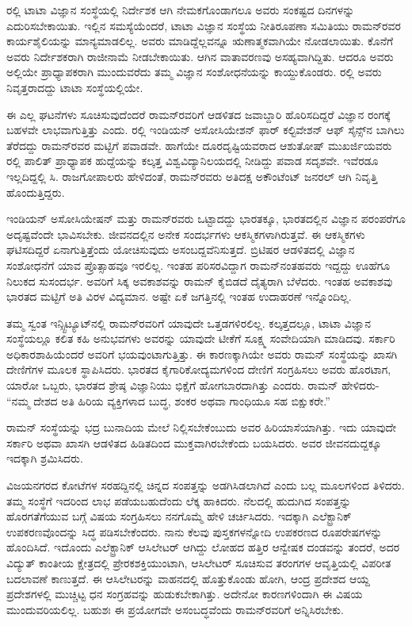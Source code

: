 ರಲ್ಲಿ ಟಾಟಾ ವಿಜ್ಞಾನ ಸಂಸ್ಥೆಯಲ್ಲಿ ನಿರ್ದೇಶಕ ಆಗಿ ನೇಮಕಗೊಂಡಾಗಲೂ ಅವರು ಸಂಕಷ್ಟದ ದಿನಗಳನ್ನು ಎದುರಿಸಬೇಕಾಯಿತು. ಇಲ್ಲಿನ ಸಮಸ್ಯೆಯೆಂದರೆ, ಟಾಟಾ ವಿಜ್ಞಾನ ಸಂಸ್ಥೆಯ ನೀತಿರೂಪಣಾ ಸಮಿತಿಯು ರಾಮನ್‍ರವರ ಕಾರ್ಯಶೈಲಿಯನ್ನು ಮಾನ್ಯಮಾಡಲಿಲ್ಲ. ಅವರು ಮಾಡಿದ್ದೆಲ್ಲವನ್ನೂ ಋಣಾತ್ಮಕವಾಗಿಯೇ ನೋಡಲಾಯಿತು. ಕೊನೆಗೆ ಅವರು ನಿರ್ದೇಶಕರಾಗಿ ರಾಜೀನಾಮೆ ನೀಡಬೇಕಾಯಿತು. ಆಗಿನ ವಾತಾವರಣವು ಅಸಹ್ಯವಾಗಿದ್ದಿತು. ಆದರೂ ಅವರು ಅಲ್ಲಿಯೇ ಪ್ರಾಧ್ಯಾಪಕರಾಗಿ ಮುಂದುವರೆದು ತಮ್ಮ ವಿಜ್ಞಾನ ಸಂಶೋಧನೆಯನ್ನು ಕಾಯ್ದುಕೊಂಡರು. ರಲ್ಲಿ ಅವರು ನಿವೃತ್ತರಾದದ್ದು ಟಾಟಾ ಸಂಸ್ಥೆಯಲ್ಲಿಯೇ.

ಈ ಎಲ್ಲ ಘಟನೆಗಳು ಸೂಚಿಸುವುದೆಂದರೆ ರಾಮನ್‍ರವರಿಗೆ ಆಡಳಿತದ ಜವಾಬ್ದಾರಿ ಹೊರಿಸದಿದ್ದರೆ ವಿಜ್ಞಾನ ರಂಗಕ್ಕೆ ಬಹಳವೇ ಲಾಭವಾಗುತ್ತಿತ್ತು ಎಂದು. ರಲ್ಲಿ ಇಂಡಿಯನ್ ಅಸೋಸಿಯೇಶನ್ ಫಾರ್ ಕಲ್ಟಿವೇಶನ್ ಆಫ್ ಸೈನ್ಸ್‌ನ ಬಾಗಿಲು ತೆರೆದದ್ದು ರಾಮನ್‍ರವರ ಮಟ್ಟಿಗೆ ಪವಾಡವೇ. ಹಾಗೆಯೇ ದೂರದೃಷ್ಟಿಯವರಾದ ಆಶುತೋಷ್ ಮುಖರ್ಜಿಯವರು ರಲ್ಲಿ ಪಾಲಿತ್ ಪ್ರಾಧ್ಯಾಪಕ ಹುದ್ದೆಯನ್ನು ಕಲ್ಕತ್ತ ವಿಶ್ವವಿದ್ಯಾನಿಲಯದಲ್ಲಿ ನೀಡಿದ್ದು ಪವಾಡ ಸದೃಶವೇ. ಇವೆರಡೂ ಇಲ್ಲದಿದ್ದಲ್ಲಿ ಸಿ. ರಾಜಗೋಪಾಲರು ಹೇಳಿದಂತೆ, ರಾಮನ್‍ರವರು ಅತಿದಕ್ಷ ಅಕೌಂಟೆಂಟ್ ಜನರಲ್ ಆಗಿ ನಿವೃತ್ತಿ ಹೊಂದುತ್ತಿದ್ದರು.

ಇಂಡಿಯನ್ ಅಸೋಸಿಯೇಷನ್ ಮತ್ತು ರಾಮನ್‍ರವರು ಒಟ್ಟಾದದ್ದು ಭಾರತಕ್ಕೂ, ಭಾರತದಲ್ಲಿನ ವಿಜ್ಞಾನ ಪರಂಪರೆಗೂ ಅದೃಷ್ಟವೆಂದೇ ಭಾವಿಸಬೇಕು. ಜೀವನದಲ್ಲಿನ ಅನೇಕ ಸಂದರ್ಭಗಳು ಆಕಸ್ಮಿಕಗಳಾಗಿರುತ್ತವೆ. ಈ ಆಕಸ್ಮಿಕಗಳು ಘಟಿಸದಿದ್ದರೆ ಏನಾಗುತ್ತಿತ್ತೆಂದು ಯೋಚಿಸುವುದು ಅಸಂಬದ್ದವೆನಿಸುತ್ತದೆ. ಬ್ರಿಟಿಷರ ಆಡಳಿತದಲ್ಲಿ ವಿಜ್ಞಾನ ಸಂಶೋಧನೆಗೆ ಯಾವ ಪ್ರೊತ್ಸಾಹವೂ ಇರಲಿಲ್ಲ. ಇಂತಹ ಪರಿಸರವಿದ್ದಾಗ ರಾಮನ್‌ನಂತಹವರು ಇದ್ದದ್ದು ಊಹೆಗೂ ನಿಲುಕದ ಸುಸಂದರ್ಭ. ಅವರಿಗೆ ಸಿಕ್ಕ ಅವಕಾಶವನ್ನು ರಾಮನ್ ಕೈಬಿಡದೆ ದೈತ್ಯರಾಗಿ ಬೆಳೆದರು. ಇಂತಹ ಅವಕಾಶವು ಭಾರತದ ಮಟ್ಟಿಗೆ ಅತಿ ವಿರಳ ವಿದ್ಯಮಾನ. ಅಷ್ಟೇ ಏಕೆ ಜಗತ್ತಿನಲ್ಲಿ ಇಂತಹ ಉದಾಹರಣೆ ಇನ್ನೊಂದಿಲ್ಲ.

ತಮ್ಮ ಸ್ವಂತ ಇನ್ಸ್ಟಿಟ್ಯೂಟ್‍ನಲ್ಲಿ ರಾಮನ್‍ರವರಿಗೆ ಯಾವುದೇ ಒತ್ತಡಗಳಿರಲಿಲ್ಲ. ಕಲ್ಕತ್ತದಲ್ಲೂ, ಟಾಟಾ ವಿಜ್ಞಾನ ಸಂಸ್ಥೆಯಲ್ಲೂ ಕಲಿತ ಕಹಿ ಅನುಭವಗಳು ಅವರನ್ನು ಯಾವುದೇ ಟೀಕೆಗೆ ಸೂಕ್ಷ್ಮ ಸಂವೇದಿಯಾಗಿ ಮಾಡಿದವು. ಸರ್ಕಾರಿ ಅಧಿಕಾರಶಾಹಿಯೆಂದರೆ ಅವರಿಗೆ ಭಯವುಂಟಾಗುತ್ತಿತ್ತು. ಈ ಕಾರಣಕ್ಕಾಗಿಯೇ ಅವರು ರಾಮನ್ ಸಂಸ್ಥೆಯನ್ನು ಖಾಸಗಿ ದೇಣಿಗೆಗಳ ಮೂಲಕ ಸ್ಥಾಪಿಸಿದರು. ಭಾರತದ ಕೈಗಾರಿಕೋದ್ಯಮಗಳಿಂದ ದೇಣಿಗೆ ಸಂಗ್ರಹಿಸಲು ಅವರು ಹೊರಟಾಗ, ಯಾರೋ ಒಬ್ಬರು, ಭಾರತದ ಶ್ರೇಷ್ಠ ವಿಜ್ಞಾನಿಯು ಭಿಕ್ಷೆಗೆ ಹೋಗಬಾರದಾಗಿತ್ತು ಎಂದರು. ರಾಮನ್ ಹೇಳಿದರು- “ನಮ್ಮ ದೇಶದ ಅತಿ ಹಿರಿಯ ವ್ಯಕ್ತಿಗಳಾದ ಬುದ್ಧ, ಶಂಕರ ಅಥವಾ ಗಾಂಧಿಯೂ ಸಹ ಬಿಕ್ಷುಕರೇ.”

ರಾಮನ್ ಸಂಸ್ಥೆಯನ್ನು ಭದ್ರ ಬುನಾದಿಯ ಮೇಲೆ ನಿಲ್ಲಿಸಬೇಕೆಂಬುದು ಅವರ ಹಿರಿಯಾಸೆಯಾಗಿತ್ತು. ಇದು ಯಾವುದೇ ಸರ್ಕಾರಿ ಅಥವಾ ಖಾಸಗಿ ಆಡಳಿತದ ಹಿಡಿತದಿಂದ ಮುಕ್ತವಾಗಿರಬೇಕೆಂದು ಬಯಸಿದರು. ಅವರ ಜೀವನದುದ್ದಕ್ಕೂ ಇದಕ್ಕಾಗಿ ಶ್ರಮಿಸಿದರು.

ವಿಜಯನಗರದ ಕೋಟೆಗಳ ಸರಹದ್ದಿನಲ್ಲಿ ಚಿನ್ನದ ಸಂಪತ್ತನ್ನು ಅಡಗಿಸಿಡಲಾಗಿದೆ ಎಂದು ಬಲ್ಲ ಮೂಲಗಳಿಂದ ತಿಳಿದರು. ತಮ್ಮ ಸಂಸ್ಥೆಗೆ ಇದರಿಂದ ಲಾಭ ಪಡೆಯಬಹುದೆಂದು ಲೆಕ್ಕ ಹಾಕಿದರು. ನೆಲದಲ್ಲಿ ಹುದುಗಿದ ಸಂಪತ್ತನ್ನು ಹೊರಗತೆಗೆಯುವ ಬಗ್ಗೆ ವಿಷಯ ಸಂಗ್ರಹಿಸಲು ನನಗೊಮ್ಮೆ ಹೇಳಿ ಚರ್ಚಿಸಿದರು. ಇದಕ್ಕಾಗಿ ಎಲೆಕ್ಟ್ರಾನಿಕ್ ಉಪಕರಣವೊಂದನ್ನು ಸಿದ್ಧ ಪಡಿಸಬೇಕೆಂದರು. ನಾನು ಕೆಲವು ಪುಸ್ತಕಗಳನ್ನೋದಿ ಉಪಕರಣದ ರೂಪರೇಷಗಳನ್ನು ಹೊಂದಿಸಿದೆ. ಇದೊಂದು ಎಲೆಕ್ಟ್ರಾನಿಕ್ ಆಸಿಲೇಟರ್ ಆಗಿದ್ದು ಲೋಹದ ಹತ್ತಿರ ಆನ್ವೇಷಕ ದಂಡವನ್ನು ತಂದರೆ, ಅದರ ವಿದ್ಯುತ್ ಕಾಂತೀಯ ಕ್ಷೇತ್ರದಲ್ಲಿ ಪ್ರೇರಕಶಕ್ತಿಯುಂಟಾಗಿ, ಆಸಿಲೇಟರ್ ಸೂಚಿಸುವ ತರಂಗಗಳ ಆವೃತ್ತಿಯಲ್ಲಿ ವಿಪರೀತ ಬದಲಾವಣೆ ಕಾಣುತ್ತದೆ. ಈ ಆಸಿಲೇಟರನ್ನು ವಾಹನದಲ್ಲಿ ಹೊತ್ತುಕೊಂಡು ಹೋಗಿ, ಆಂದ್ರ ಪ್ರದೇಶದ ಆಯ್ದ ಪ್ರದೇಶಗಳಲ್ಲಿ ಮುಚ್ಚಿಟ್ಟ ಧನ ಸಂಗ್ರಹವನ್ನು ಹುಡುಕಬೇಕಾಗಿತ್ತು. ಅದೇನೋ ಕಾರಣಗಳಿಂದಾಗಿ ಈ ವಿಷಯ ಮುಂದುವರಿಯಲಿಲ್ಲ. ಬಹುಶಃ ಈ ಪ್ರಯೋಗವೇ ಅಸಂಬದ್ಧವೆಂದು ರಾಮನ್‍ರವರಿಗೆ ಅನ್ನಿಸಿರಬೇಕು.

